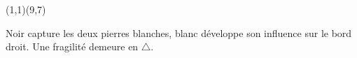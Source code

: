 \documentclass[preview, border=0pt, varwidth=false]{standalone}
\begin{document}
	\setgounit{0.6cm} 
	
	\parbox[c][14.65cm][c]{10.2cm}{
		\centering
		
		\begin{psgopartialboard}{(1,1)(9,7)}
			\pass
		\end{psgopartialboard}
		
		\vspace{1em}
		Noir capture les deux pierres blanches, blanc développe son influence sur le bord droit. Une fragilité demeure en $\triangle$.
	}
	
\end{document}
